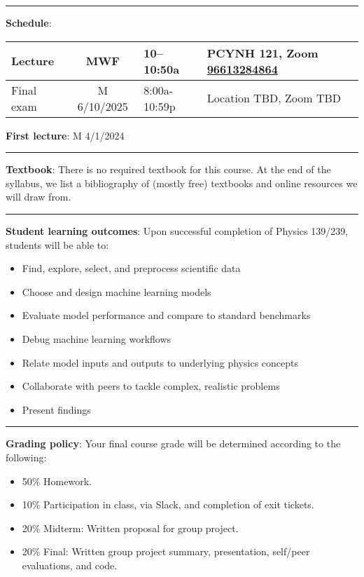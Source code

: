\documentclass[12pt]{article}
\begin{document}
\begin{center}
	\rule{\textwidth}{0.5pt}
\end{center}

\noindent\textbf{Schedule}:
\begin{center}
	\begin{tabular}{|l|c|l|m{60mm}|}
		\hline
		Lecture    & MWF         & 10--10:50a   & PCYNH	121, Zoom \href{https://ucsd.zoom.us/j/96613284864}{96613284864} \\\hline
		Final exam & M 6/10/2025 & 8:00a-10:59p & Location TBD, Zoom TBD                                                 \\\hline
	\end{tabular}
\end{center}

\noindent\textbf{First lecture}: M 4/1/2024

\begin{center}
	\rule{\textwidth}{0.5pt}
\end{center}

\noindent\textbf{Textbook}: There is no required textbook for this course.
At the end of the syllabus, we list a bibliography of (mostly free) textbooks and online resources we will draw from.

\begin{center}
	\rule{\textwidth}{0.5pt}
\end{center}

\noindent\textbf{Student learning outcomes}: Upon successful completion of Physics 139/239, students will be able to:
\begin{itemize}
	\item Find, explore, select, and preprocess scientific data
	\item Choose and design machine learning models
	\item Evaluate model performance and compare to standard benchmarks
	\item Debug machine learning workflows
	\item Relate model inputs and outputs to underlying physics concepts
	\item Collaborate with peers to tackle complex, realistic problems
	\item Present findings
\end{itemize}

\begin{center}
	\rule{\textwidth}{0.5pt}
\end{center}

\noindent\textbf{Grading policy}: Your final course grade will be determined according to the following:
\begin{itemize}
	\item 50\% Homework.
	\item 10\% Participation in class, via Slack, and completion of exit tickets.
	\item 20\% Midterm: Written proposal for group project.
	\item 20\% Final: Written group project summary, presentation, self/peer evaluations, and code.
\end{itemize}
\end{document}
